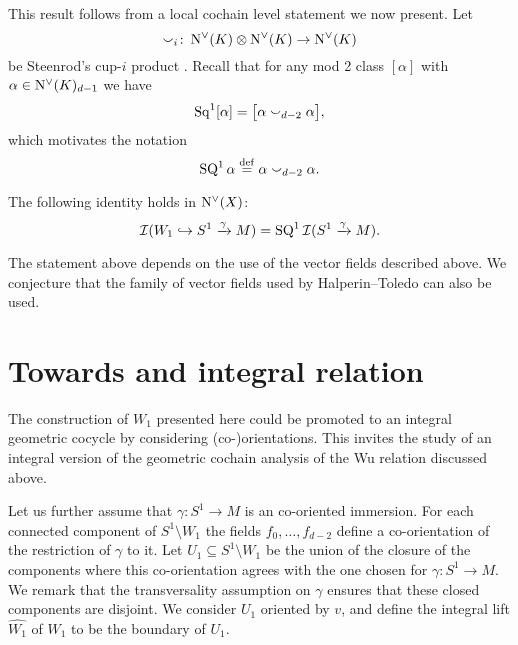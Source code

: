 This result follows from a local cochain level statement we now present.
Let
\[
\smallsmile_i \colon \operatorname{N^{\vee}}(K) \otimes \operatorname{N^{\vee}}(K) \to \operatorname{N^{\vee}}(K)
\]
be Steenrod's cup-$i$ product \cite{steenrod1947products, medina2022axiomatic}.
Recall that for any mod 2 class $[\alpha]$ with $\alpha \in \operatorname{N^{\vee}}(K)_{d-1}$ we have
\[
\operatorname{Sq}^1 [\alpha] = \big[ \alpha \smallsmile_{d-2} \alpha \big],
\]
which motivates the notation
\[
\operatorname{SQ}^1 \alpha \stackrel{\mathrm{def}}{=} \alpha \smallsmile_{d-2} \alpha.
\]
\begin{proposition}
	The following identity holds in $\operatorname{N^{\vee}}(X)$:
	\[
	\mathcal{I}(W_1 \hookrightarrow S^1 \xrightarrow{\gamma} M) = \operatorname{SQ}^1 \mathcal{I}(S^1 \xrightarrow{\gamma} M).
	\]
\end{proposition}

The statement above depends on the use of the vector fields described above.
We conjecture that the family of vector fields used by Halperin--Toledo \cite{halperin1972stiefel} can also be used.

\section*{Towards and integral relation}

The construction of $W_1$ presented here could be promoted to an integral geometric cocycle by considering (co-)orientations.
This invites the study of an integral version of the geometric cochain analysis of the Wu relation discussed above.

Let us further assume that $\gamma \colon S^1 \to M$ is an co-oriented immersion.
For each connected component of $S^1 \setminus W_1$ the fields $f_0, \dots, f_{d-2}$ define a co-orientation of the restriction of $\gamma$ to it.
Let $U_1 \subseteq S^1 \setminus W_1$ be the union of the closure of the components where this co-orientation agrees with the one chosen for $\gamma \colon S^1 \to M$.
We remark that the transversality assumption on $\gamma$ ensures that these closed components are disjoint.
We consider $U_1$ oriented by $v$, and define the integral lift $\widehat{W_1}$ of $W_1$ to be the boundary of $U_1$.

